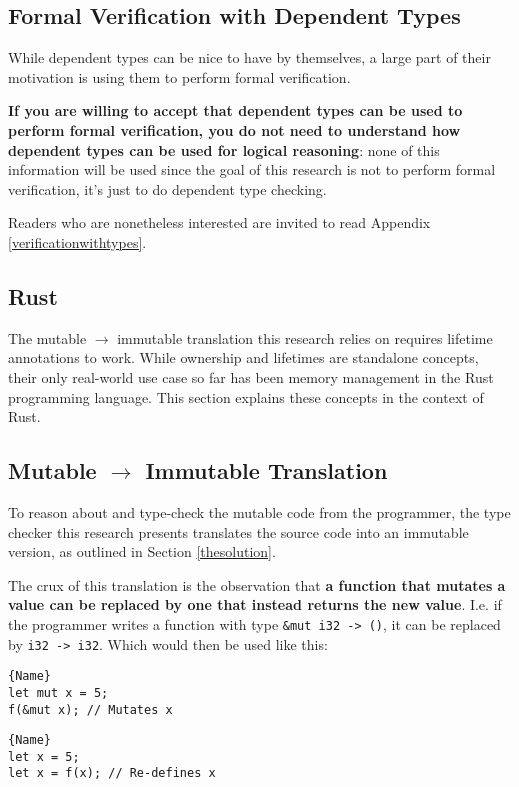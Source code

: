 \documentclass[12pt,twoside]{report}
\begin{document}
\subsection{Formal Verification with Dependent Types}
While dependent types can be nice to have by themselves, a large part of their motivation is using them to perform formal verification.

\textbf{If you are willing to accept that dependent types can be used to perform formal verification, you do not need to understand how dependent types can be used for logical reasoning}: none of this information will be used since the goal of this research is not to perform formal verification, it's just to do dependent type checking.

Readers who are nonetheless interested are invited to read Appendix \ref{verificationwithtypes}.

\subsection{Rust}
The mutable $\rightarrow$ immutable translation this research relies on requires lifetime annotations to work. While ownership and lifetimes are standalone concepts, their only real-world use case so far has been memory management in the Rust programming language. This section explains these concepts in the context of Rust.


\subsection{Mutable $\rightarrow$ Immutable Translation}
To reason about and type-check the mutable code from the programmer, the type checker this research presents translates the source code into an immutable version, as outlined in Section \ref{thesolution}.

The crux of this translation is the observation that \textbf{a function that mutates a value can be replaced by one that instead returns the new value}. I.e. if the programmer writes a function with type \verb|&mut i32 -> ()|, it can be replaced by \verb|i32 -> i32|. Which would then be used like this:

\noindent\begin{minipage}{.45\textwidth}
\begin{lstlisting}[caption=Original]{Name}
let mut x = 5;
f(&mut x); // Mutates x
\end{lstlisting}
\end{minipage}\hfill
\begin{minipage}{.45\textwidth}
\begin{lstlisting}[caption=Translated]{Name}
let x = 5;
let x = f(x); // Re-defines x
\end{lstlisting}
\end{minipage}
\end{document}
